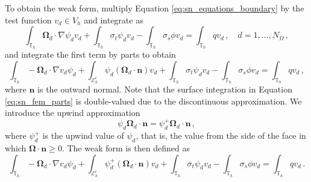 \documentclass{article}
\newcommand{\vo}{\mathbf{\Omega}} %
\newcommand{\vn}{\mathbf{n}} %
\begin{document}
To obtain the weak form, multiply Equation \eqref{eq:sn_equations_boundary} by the test function $v_d \in V_h$ and integrate as
\begin{equation}
	\int_{\mathbb{T}_h} \vo_d \cdot \nabla \psi_d v_d + \int_{\mathbb{T}_h} \sigma_t \psi_d v_d - \int_{\mathbb{T}_h} \sigma_s \phi v_d = \int_{\mathbb{T}_h} qv_d\,, \quad d = 1, \ldots, N_\Omega\,,
\end{equation}
and integrate the first term by parts to obtain
\begin{equation}
	\label{eq:sn_fem_parts}
	\int_{\mathbb{T}_h} -\vo_d \cdot \nabla v_d\psi_d + \int_{\mathcal{E}_h^i} \psi_d (\vo_d \cdot \vn) v_d + \int_{\mathbb{T}_h} \sigma_t \psi_d v_d - \int_{\mathbb{T}_h} \sigma_s \phi v_d = \int_{\mathbb{T}_h} qv_d\,,
\end{equation}
where $\vn$ is the outward normal. Note that the surface integration in Equation \eqref{eq:sn_fem_parts} is double-valued due to the discontinuous approximation. We introduce the upwind approximation
\begin{equation}
	\psi_d \vo_d \cdot \vn = \psi^+_d \vo_d \cdot \vn\,,
\end{equation}
where $\psi_d^+$ is the upwind value of $\psi_d$, that is, the value from the side of the face in which $\vo \cdot \vn \geq 0$. The weak form is then defined as
\begin{equation}
	\label{eq:sn_fem_upwind}
	\int_{\mathbb{T}_h} -\vo_d \cdot \nabla v_d\psi_d + \int_{\mathcal{E}_h^i} \psi_d^+ (\vo_d \cdot \vn) v_d + \int_{\mathbb{T}_h} \sigma_t \psi_d v_d - \int_{\mathbb{T}_h} \sigma_s \phi v_d = \int_{\mathbb{T}_h} qv_d\,.
	\end{equation}
\end{document}
